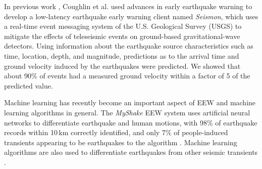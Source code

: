 \documentclass[preprint, aps, showpacs]{revtex4-1}
\begin{document}
In previous work \cite{CoEa2017}, Coughlin et al. used advances in early earthquake warning to develop a low-latency earthquake early warning client named \emph{Seismon}, which uses a real-time event messaging system of the U.S. Geological Survey (USGS) to mitigate the effects of teleseismic events on ground-based gravitational-wave detectors. 
Using information about the earthquake source characteristics such as time, location, depth, and magnitude, predictions as to the arrival time and ground velocity induced by the earthquakes were predicted.
We showed that about 90\% of events had a measured ground velocity within a factor of 5 of the predicted value.

Machine learning has recently become an important aspect of EEW and machine learning algorithms in general.
The \emph{MyShake} EEW system uses artificial neural networks to differentiate earthquake and human motions, with 98\% of earthquake records within 10\,km correctly identified, and only 7\% of people-induced transients appearing to be earthquakes to the algorithm  \cite{KoAl2016}.
Machine learning algorithms are also used to differentiate earthquakes from other seismic transients \cite{KuYi2011}.
\end{document}
